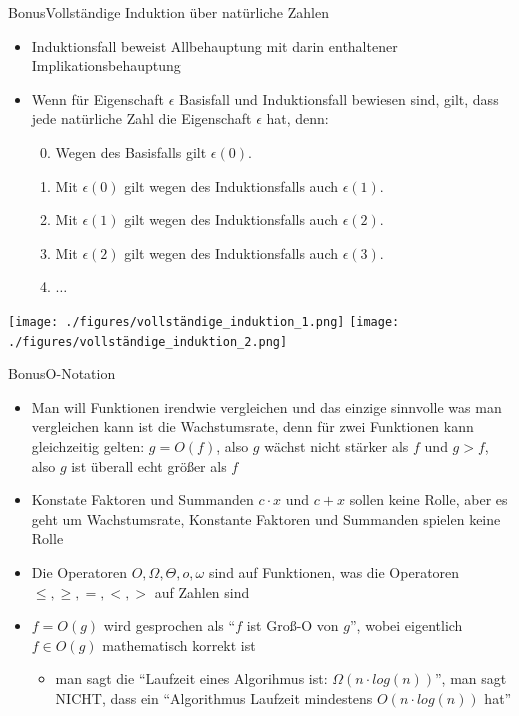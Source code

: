 \begin{frame}[allowframebreaks]{Bonus}{Vollständige Induktion über natürliche Zahlen\vspace{0.5cm}}
\begin{itemize}
  \end{itemize}
  \begin{itemize}
    \item Induktionsfall beweist Allbehauptung mit darin enthaltener Implikationsbehauptung 
    \item Wenn für Eigenschaft $\epsilon$ Basisfall und Induktionsfall bewiesen sind, gilt, dass jede natürliche Zahl die Eigenschaft $\epsilon$ hat, denn:
    \begin{enumerate}
      \setcounter{enumi}{-1}
      \item Wegen des Basisfalls gilt $\epsilon(0)$.
      \item Mit $\epsilon(0)$ gilt wegen des Induktionsfalls auch $\epsilon(1)$.
      \item Mit $\epsilon(1)$ gilt wegen des Induktionsfalls auch $\epsilon(2)$.
      \item Mit $\epsilon(2)$ gilt wegen des Induktionsfalls auch $\epsilon(3)$.
      \item $\ldots$
    \end{enumerate}
  \end{itemize}
  \texttt{[image: ./figures/vollständige\_induktion\_1.png]}
  \texttt{[image: ./figures/vollständige\_induktion\_2.png]}
\end{frame}

\begin{frame}{Bonus}{O-Notation}
  \begin{itemize}
    \item Man will Funktionen irendwie vergleichen und das einzige sinnvolle was man vergleichen kann ist die \alert{Wachstumsrate}, denn für zwei Funktionen kann gleichzeitig gelten: $g = O(f)$, also $g$ wächst nicht stärker als $f$ und $g > f$, also $g$ ist überall echt größer als $f$
    \item Konstate Faktoren und Summanden $c \cdot x$ und $c + x$ sollen keine Rolle, aber es geht um \alert{Wachstumsrate}, Konstante Faktoren und Summanden spielen keine Rolle
    \item Die Operatoren $O, \Omega, \Theta, o, \omega$ sind auf Funktionen, was die Operatoren $\le, \ge, =, <, >$ auf Zahlen sind
    \item $f= O(g)$ wird gesprochen als \enquote{$f$ ist Groß-O von $g$}, wobei eigentlich $f\in O(g)$ mathematisch korrekt ist
    \begin{itemize}
      \item man sagt die \enquote{Laufzeit eines Algorihmus ist: $\Omega(n\cdot log(n))$}, man sagt \alert{NICHT}, dass ein \enquote{Algorithmus Laufzeit mindestens $O(n\cdot log(n))$ hat}
    \end{itemize}
  \end{itemize}
\end{frame}

